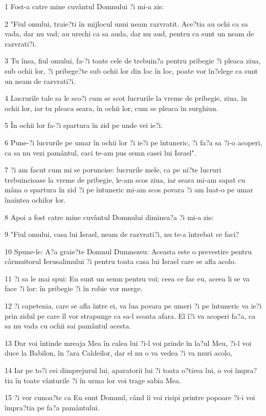 \par 1 Fost-a catre mine cuvântul Domnului ?i mi-a zis:
\par 2 "Fiul omului, traie?ti în mijlocul unui neam razvratit. Ace?tia au ochi ca sa vada, dar nu vad; au urechi ca sa auda, dar nu aud, pentru ca sunt un neam de razvrati?i.
\par 3 Tu însa, fiul omului, fa-?i toate cele de trebuin?a pentru pribegie ?i pleaca ziua, sub ochii lor, ?i pribege?te sub ochii lor din loc în loc, poate vor în?elege ca sunt un neam de razvrati?i.
\par 4 Lucrurile tale sa le sco?i cum se scot lucrurile la vreme de pribegie, ziua, în ochii lor, iar tu pleaca seara, în ochii lor, cum se pleaca în surghiun.
\par 5 În ochii lor fa-?i spartura în zid pe unde vei ie?i.
\par 6 Pune-?i lucrurile pe umar în ochii lor ?i ie?i pe întuneric, ?i fa?a sa ?i-o acoperi, ca sa nu vezi pamântul, caci te-am pus semn casei lui Israel".
\par 7 ?i am facut cum mi se poruncise: lucrurile mele, ca pe ni?te lucruri trebuincioase la vreme de pribegie, le-am scos ziua, iar seara mi-am sapat cu mâna o spartura în zid ?i pe întuneric mi-am scos povara ?i am luat-o pe umar înaintea ochilor lor.
\par 8 Apoi a fost catre mine cuvântul Domnului diminea?a ?i mi-a zis:
\par 9 "Fiul omului, casa lui Israel, neam de razvrati?i, nu te-a întrebat ce faci?
\par 10 Spune-le: A?a graie?te Domnul Dumnezeu: Aceasta este o prevestire pentru cârmuitorul Ierusalimului ?i pentru toata casa lui Israel care se afla acolo.
\par 11 ?i sa le mai spui: Eu sunt un semn pentru voi; ceea ce fac eu, aceea li se va face ?i lor: în pribegie ?i în robie vor merge.
\par 12 ?i capetenia, care se afla între ei, va lua povara pe umeri ?i pe întuneric va ie?i prin zidul pe care îl vor strapunge ca sa-l scoata afara. El î?i va acoperi fa?a, ca sa nu vada cu ochii sai pamântul acesta.
\par 13 Dar voi întinde mreaja Mea în calea lui ?i-l voi prinde în la?ul Meu, ?i-l voi duce la Babilon, în ?ara Caldeilor, dar el nu o va vedea ?i va muri acolo,
\par 14 Iar pe to?i cei dimprejurul lui, aparatorii lui ?i toata o?tirea lui, o voi împra?tia în toate vânturile ?i în urma lor voi trage sabia Mea.
\par 15 ?i vor cunoa?te ca Eu sunt Domnul, când îi voi risipi printre popoare ?i-i voi împra?tia pe fa?a pamântului.

